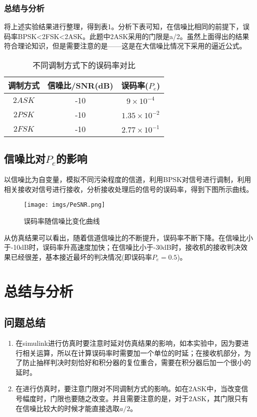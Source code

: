 \documentclass[a4paper]{article}
\begin{document}
\subsubsection{总结与分析}
将上述实验结果进行整理，得到表1。分析下表可知，在信噪比相同的前提下，误码率BPSK<2FSK<2ASK。此题中2ASK采用的门限是a/2。虽然上面得出的结果符合理论知识，但是需要注意的是——这是在大信噪比情况下采用的逼近公式。

\begin{table}[h]
\centering
\caption{不同调制方式下的误码率对比}
\begin{tabular}[h]{ccc}
\hline
调制方式& 信噪比/SNR(dB)& 误码率($P_e$)\\
\hline
$2ASK$ &  -10 &$9\times 10^{-4}$\\
$2PSK$ &  -10 &$1.35\times 10^{-2}$\\
$2FSK$ &  -10 &$2.77\times 10^{-1}$\\
\hline
\end{tabular}
\end{table}

\subsection{信噪比对$P_e$的影响}
以信噪比为自变量，模拟不同污染程度的信道，利用BPSK对信号进行调制，利用相关接收对信号进行接收，分析接收处理后的信号的误码率，得到下图所示曲线。

\begin{figure}[htbp]
\centering
\texttt{[image: imgs/PeSNR.png]}
\caption{误码率随信噪比变化曲线}
\end{figure}

从仿真结果可以看出，随着信道信噪比的不断提升，误码率不断下降。在信噪比小于-10dB时，误码率升高速度加快；在信噪比小于-30dB时，接收机的接收判决效果已经很差，基本接近最坏的判决情况(即误码率$P_e=0.5$)。



\section{总结与分析}
\subsection{问题总结}
\begin{enumerate}[(1)]
\item
在simulink进行仿真时要注意时延对仿真结果的影响，如本实验中，因为要进行相关运算，所以在计算误码率时需要加一个单位的时延；在接收机部分，为了防止抽样判决时刻恰好和积分器的复位重合，需要在积分器后加一个很小的延时。
\item 
在进行仿真时，要注意门限对不同调制方式的影响。如在2ASK中，当改变信号幅度时，门限也要随之改变。并且需要注意的是，对于2ASK，其门限只有在信噪比较大的时候才能直接选取$a/2$。
\end{enumerate}
\end{document}
